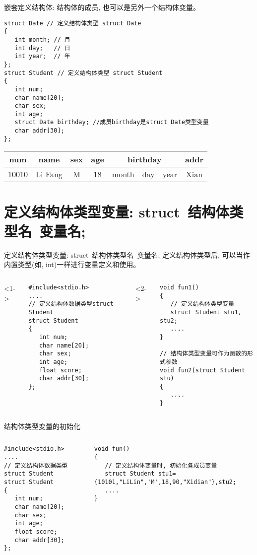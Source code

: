 \begin{frame}{\small 嵌套定义结构体: 结构体的成员, 也可以是另外一个结构体变量。}
\begin{lstlisting}
struct Date // 定义结构体类型 struct Date 
{
   int month; // 月
   int day;   // 日
   int year;  // 年
}; 
struct Student // 定义结构体类型 struct Student
{ 
   int num;
   char name[20];
   char sex;
   int age;
   struct Date birthday; //成员birthday是struct Date类型变量
   char addr[30]; 
};
\end{lstlisting}
\begin{tabular}{|c|c|c|c|c|c|c|c|}
	\hline 
	num & name & sex & age & \multicolumn{3}{c|}{birthday} & addr \\ 
	\hline 
	10010 & Li Fang & M & 18 & month & day & year & Xian \\ 
	\hline 
\end{tabular} 
\medskip
\end{frame}

\section{定义结构体类型变量: struct\, 结构体类型名\, 变量名;}

\begin{frame}{定义结构体类型变量: struct\, 结构体类型名\, 变量名;}
定义结构体类型后, 可以当作内置类型(如, int)一样进行变量定义和使用。
\begin{columns}[T]
<1->
\begin{lstlisting}
#include<stdio.h>
....
// 定义结构体数据类型struct Student
struct Student 
{
   int num;
   char name[20]; 
   char sex; 
   int age; 
   float score; 
   char addr[30]; 
};         
\end{lstlisting}
<2->
\begin{lstlisting}
void fun1()
{
   // 定义结构体类型变量
   struct Student stu1, stu2; 
   .... 
}

// 结构体类型变量可作为函数的形式参数
void fun2(struct Student stu)
{
   ....
}
\end{lstlisting}
\end{columns}
\end{frame}

\begin{frame}{结构体类型变量的初始化}
\begin{columns}[T]
\begin{lstlisting}
#include<stdio.h>
....
// 定义结构体数据类型struct Student
struct Student 
{
   int num;
   char name[20]; 
   char sex; 
   int age; 
   float score; 
   char addr[30]; 
};         
\end{lstlisting}
\begin{lstlisting}
void fun()
{
   // 定义结构体变量时, 初始化各成员变量
   struct Student stu1={10101,"LiLin",'M',18,90,"Xidian"},stu2; 
   .... 
}
\end{lstlisting}
\end{columns}
\end{frame}

